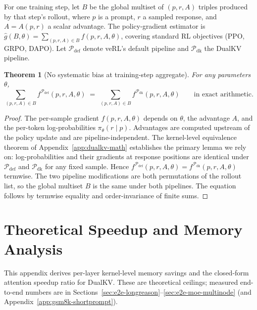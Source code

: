 \documentclass{article}
\newtheorem{theorem}{Theorem}
\begin{document}
For one training step, let $B$ be the global multiset of $(p,r,A)$ triples produced by that step's rollout, where $p$ is a prompt, $r$ a sampled response, and $A=A(p,r)$ a scalar advantage. The policy-gradient estimator is $\hat g(B,\theta) = \sum_{(p,r,A) \in B} f(p,r,A,\theta)$, covering standard RL objectives (PPO, GRPO, DAPO). Let $\mathcal{P}_{\text{def}}$ denote veRL's default pipeline and $\mathcal{P}_{\text{dk}}$ the DualKV pipeline.

\begin{theorem}[No systematic bias at training-step aggregate]
For any parameters $\theta$,
\begin{equation}
  \sum_{(p,r,A) \in B} f^{\mathcal{P}_{\text{def}}}(p,r,A,\theta) \;=\; \sum_{(p,r,A) \in B} f^{\mathcal{P}_{\text{dk}}}(p,r,A,\theta) \qquad \text{in exact arithmetic.}
\end{equation}
\end{theorem}

\begin{proof}
The per-sample gradient $f(p,r,A,\theta)$ depends on $\theta$, the advantage $A$, and the per-token log-probabilities $\pi_\theta(r \mid p)$. Advantages are computed upstream of the policy update and are pipeline-independent. The kernel-level equivalence theorem of Appendix~\ref{app:dualkv-math} establishes the primary lemma we rely on: log-probabilities and their gradients at response positions are identical under $\mathcal{P}_{\text{def}}$ and $\mathcal{P}_{\text{dk}}$ for any fixed sample. Hence $f^{\mathcal{P}_{\text{def}}}(p,r,A,\theta) = f^{\mathcal{P}_{\text{dk}}}(p,r,A,\theta)$ termwise. The two pipeline modifications are both permutations of the rollout list, so the global multiset $B$ is the same under both pipelines. The equation follows by termwise equality and order-invariance of finite sums.
\end{proof}

\section{Theoretical Speedup and Memory Analysis}
\label{app:theoretical-analysis}

This appendix derives per-layer kernel-level memory savings and the closed-form attention speedup ratio for DualKV. These are theoretical ceilings; measured end-to-end numbers are in Sections~\ref{sec:e2e-longreason}--\ref{sec:e2e-moe-multinode} (and Appendix~\ref{app:gsm8k-shortprompt}).
\end{document}
